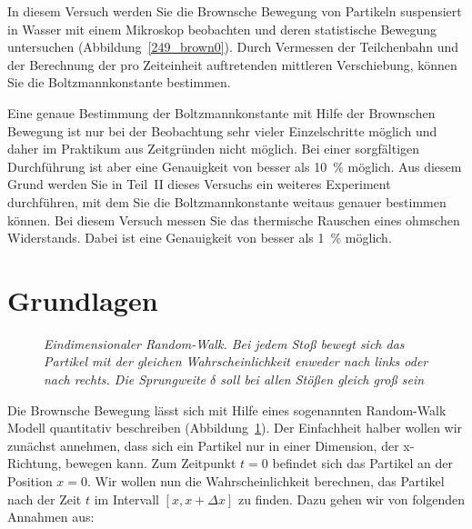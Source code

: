\documentclass{../papanleitung}
\begin{document}
In diesem Versuch werden Sie die Brownsche Bewegung von
Partikeln suspensiert in Wasser mit einem Mikroskop beobachten
und deren statistische Bewegung untersuchen
(Abbildung~\ref{249_brown0}). Durch Vermessen der Teilchenbahn und
der Berechnung der pro Zeiteinheit auftretenden mittleren
Verschiebung, k\"{o}nnen Sie die Boltzmannkonstante bestimmen.

Eine genaue Bestimmung der Boltzmannkonstante mit Hilfe der
Brownschen Bewegung ist nur bei der Beobachtung sehr vieler
Einzelschritte m\"{o}glich und daher im Praktikum aus Zeitgr\"{u}nden
nicht m\"{o}glich. Bei einer sorgf\"{a}ltigen Durchf\"{u}hrung ist aber eine
Genauigkeit von besser als 10~$\%$ m\"{o}glich. Aus diesem Grund
werden Sie in Teil~II dieses Versuchs ein weiteres Experiment
durchf\"{u}hren, mit dem Sie die Boltzmannkonstante weitaus genauer
bestimmen k\"{o}nnen. Bei diesem Versuch messen Sie das thermische
Rauschen eines ohmschen Widerstands. Dabei ist eine Genauigkeit
von besser als 1~$\%$ m\"{o}glich.

\section{Grundlagen}

\begin{figure}[h]
\begin{minipage}[c]{12cm}
\centering{}
\caption{\label{249_randomwalk}\fontsize{10}{12}\it
Eindimensionaler Random-Walk. Bei jedem Sto{\ss} bewegt sich das
Partikel mit der gleichen Wahrscheinlichkeit enweder nach links
oder nach rechts. Die Sprungweite $\delta$ soll bei allen St\"{o}{\ss}en
gleich gro{\ss} sein}
\end{minipage}
\end{figure}




 Die Brownsche Bewegung l\"{a}sst sich mit Hilfe
eines sogenannten Random-Walk Modell quantitativ beschreiben
(Abbildung~\ref{249_randomwalk}). Der Einfachheit halber wollen
wir zun\"{a}chst annehmen, dass sich ein Partikel nur in einer
Dimension, der x-Richtung, bewegen kann. Zum Zeitpunkt $t=0$
befindet sich das Partikel an der Position $x=0$. Wir wollen nun
die Wahrscheinlichkeit berechnen, das Partikel nach der Zeit $t$
im Intervall $[x,x+\Delta x]$ zu finden. Dazu gehen wir von
folgenden Annahmen aus:
\end{document}
